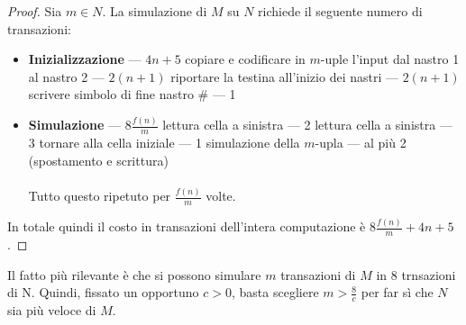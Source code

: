 \begin{proof}
	Sia $m \in N$. La simulazione di $M$ su $N$ richiede il seguente numero di transazioni:
	\begin{itemize}
		\item \textbf{Inizializzazione} --- $4n + 5$
			\subitem copiare e codificare in $m$-uple l'input dal nastro 1 al nastro 2 --- $2(n+1)$
			\subitem riportare la testina all'inizio dei nastri --- $2(n+1)$
			\subitem scrivere simbolo di fine nastro $\#$ --- 1
		\item \textbf{Simulazione} --- $8\frac{f(n)}{m}$
			\subitem lettura cella a sinistra --- 2
			\subitem lettura cella a sinistra --- 3
			\subitem tornare alla cella iniziale --- 1
			\subitem simulazione della $m$-upla --- al più 2 (spostamento e scrittura) \\ \\
		Tutto questo ripetuto per $\frac{f(n)}{m}$ volte.
	\end{itemize}
	In totale quindi il costo in transazioni dell'intera computazione è $8\frac{f(n)}{m} + 4n + 5$.
\end{proof}

Il fatto più rilevante è che si possono simulare $m$ transazioni di $M$ in 8 trnsazioni di N. Quindi, fissato un opportuno $c > 0$, basta scegliere $m > \frac{8}{c}$ per far sì che $N$ sia più veloce di $M$.
